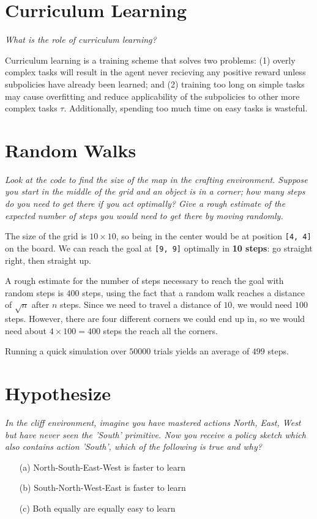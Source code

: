 \documentclass[a4paper,10pt]{article}
\begin{document}
\section{Curriculum Learning}
{\it
What is the role of curriculum learning?\\
}

Curriculum learning is a training scheme that solves two
problems: (1) overly complex tasks will result in the agent
never recieving any positive reward unless subpolicies have
already been learned; and (2) training too long on simple
tasks may cause overfitting and reduce applicability of 
the subpolicies to other more complex tasks $\tau$. Additionally,
spending too much time on easy tasks is wasteful.

\section{Random Walks}
{\it
Look at the code to find the size of the map in the crafting environment. Suppose you start
in the middle of the grid and an object is in a corner; how many steps do you need to get
there if you act optimally? Give a rough estimate of the expected number of steps you would
need to get there by moving randomly.\\
}

The size of the grid is $10 \times 10$, so being in the center
would be at position {\tt[4, 4]} on the board. We can reach the
goal at {\tt[9, 9]} optimally in {\bf 10 steps}: go straight right,
then straight up.

A rough estimate for the number of steps necessary to reach
the goal with random steps is $400$ steps, using the fact that
a random walk reaches a distance of $\sqrt{n}$ after $n$ steps.
Since we need to travel a distance of $10$, we would need
$100$ steps. However, there are four different corners we
could end up in, so we would need about $4 \times 100 = 400$ steps
the reach all the corners.

Running a quick simulation over $50000$ trials yields an average
of $499$ steps.

\section{Hypothesize}
{\it
In the cliff environment, imagine you have mastered actions
North, East, West but have never seen the ’South’ primitive.
Now you receive a policy sketch which also contains
action ’South’, which of the following is true and why?
\begin{enumerate}[noitemsep]
\item[(a)] North-South-East-West is faster to learn
\item[(b)] South-North-West-East is faster to learn
\item[(c)] Both equally are equally easy to learn
\end{enumerate}
}
\end{document}

